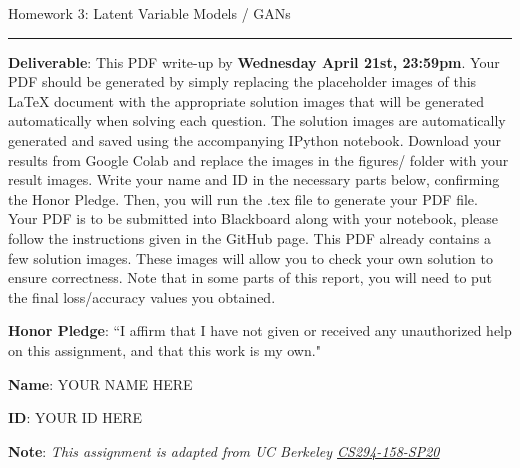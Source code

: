 \documentclass{article}
\newcommand{\ruleskip}{\bigskip\hrule\bigskip}
\begin{document}
\pagestyle{myheadings} 

{\huge
\noindent Homework 3: Latent Variable Models / GANs}
\ruleskip

{\bf Deliverable}: This PDF write-up by {\bf Wednesday April 21st, 23:59pm}.  Your PDF should be generated by simply replacing the placeholder images of this LaTeX document with the appropriate solution images that will be generated automatically when solving each question. The solution images are automatically generated and saved using the accompanying IPython notebook.  Download your results from Google Colab and replace the images in the figures/ folder with your result images. Write your name and ID in the necessary parts below, confirming the Honor Pledge. Then, you will run the .tex file to generate your PDF file. Your PDF is to be submitted into Blackboard along with your notebook, please follow the instructions given in the GitHub page. This PDF already contains a few solution images.  These images will allow you to check your own solution to ensure correctness. Note that in some parts of this report, you will need to put the final loss/accuracy values you obtained.

{\bf Honor Pledge}: ``I affirm that I have not given or received any unauthorized help on this assignment, and that this work is my own."

{\bf Name}: YOUR NAME HERE

{\bf ID}: YOUR ID HERE

\vspace{.1in}

{\bf Note}: \textit{This assignment is adapted from UC Berkeley \href{https://sites.google.com/view/berkeley-cs294-158-sp20/home}{CS294-158-SP20}}
\vspace{.2in}

\end{document}
